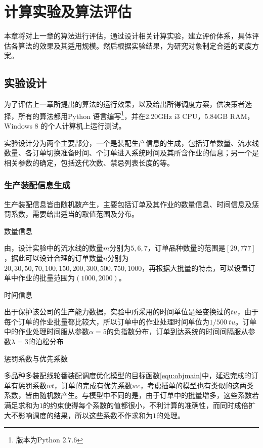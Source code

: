\chapter{计算实验及算法评估}
本章将对上一章的算法进行评估，通过设计相关计算实验，建立评价体系，具体评估各算法的效果及其适用规模。然后根据实验结果，为研究对象制定合适的调度方案。
\section{实验设计}
为了评估上一章所提出的算法的运行效果，以及给出所得调度方案，供决策者选择，所有的算法都用Python 语言编写\footnote{版本为Python 2.7.6}，并在2.20GHz i3 CPU，5.84GB RAM，Windows 8 的个人计算机上运行测试。

实验设计分为两个主要部分，一个是装配生产信息的生成，包括订单数量、流水线数量、各订单切换准备时间、个订单进入系统时间及其所含作业的信息；另一个是相关参数的确定，包括迭代次数、禁忌列表长度的等。
\subsection{生产装配信息生成}
生产装配信息皆由随机数产生，主要包括订单及其作业的数量信息、时间信息及惩罚系数，需要给出适当的取值范围及分布。
\begin{asparaenum}
\item 数量信息

由，设计实验中的流水线的数量$m$分别为$5,6,7$，订单品种数量的范围是$[29,777]$，据此可以设计合理的订单数量$n$分别为$20,30,50,70,100,150,200,300,500,750,1000$，再根据大批量的特点，可以设置订单中作业的批量范围为$(1000,2000)$。
\item 时间信息

出于保护该公司的生产能力数据，实验中所采用的时间单位是经变换过的$tu$，由于每个订单的作业批量都比较大，所以订单中的作业处理时间单位为$1/500\ tu$。订单中的作业处理时间服从参数$\alpha = 5$的负指数分布，订单到达系统的时间间隔服从参数$\lambda = 3$的泊松分布
\item 惩罚系数与优先系数
\end{asparaenum}

多品种多装配线轮番装配调度优化模型的目标函数\eqref{equ:objmain}中，延迟完成的订单有惩罚系数$wt$，订单的完成有优先系数$wc$，考虑插单的模型也有类似的这两类系数，皆由随机数产生。与模型中不同的是，由于订单中的批量增多，这些系数若满足求和为$1$的约束使得每个系数的值都很小，不利计算的准确性，而同时成倍扩大不影响调度的结果，所以这些系数不作求和为$1$的处理。

